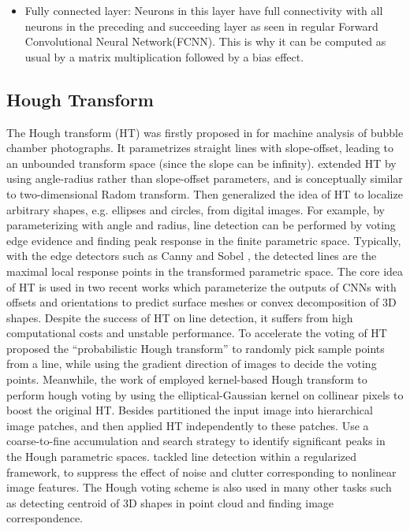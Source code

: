 \begin{itemize}
\item Fully connected layer: Neurons in this layer have full connectivity with all neurons in the preceding and succeeding layer as seen in regular Forward Convolutional Neural Network(FCNN). This is why it can be computed as usual by a matrix multiplication followed by a bias effect.
\end{itemize}

\subsection{Hough Transform}
The Hough transform (HT) was firstly proposed in for machine analysis of bubble chamber photographs. It parametrizes straight lines with slope-offset, leading to an unbounded transform space (since the slope can be infinity). extended HT by using angle-radius rather than slope-offset parameters, and is conceptually similar to two-dimensional Radom transform. Then generalized the idea of HT to localize arbitrary shapes, e.g. ellipses and circles, from digital images. For example, by parameterizing with angle and radius, line detection can be performed by voting edge evidence and finding peak response in the finite parametric space. Typically, with the edge detectors such as Canny  and Sobel , the detected lines are the maximal local response points in the transformed parametric space. The core idea of HT is used in two recent works which parameterize the outputs of CNNs with offsets and orientations to predict surface meshes  or convex decomposition  of 3D shapes. Despite the success of HT on line detection, it suffers from high computational costs and unstable performance. To accelerate the voting of HT proposed the “probabilistic Hough transform” to randomly pick sample points from a line, while  using the gradient direction of images to decide the voting points. Meanwhile, the work of employed kernel-based Hough transform to perform hough voting by using the elliptical-Gaussian kernel on collinear pixels to boost the original HT. Besides partitioned the input image into hierarchical image patches, and then applied HT independently to these patches. Use a coarse-to-fine accumulation and search strategy to identify significant peaks in the Hough parametric spaces. tackled line detection within a regularized framework, to suppress the effect of noise and clutter corresponding to nonlinear image features. The Hough voting scheme is also used in many other tasks such as detecting centroid of 3D shapes in point cloud and finding image correspondence.

